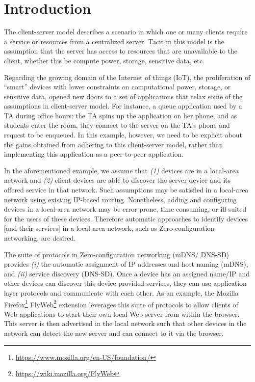 \section{Introduction}
\label{sec:introduction}


The client-server model describes a scenario in which one or many clients require a service or resources from a centralized server. Tacit in this model is the assumption that the server has access to resources that are unavailable to the client, whether this be compute power, storage, sensitive data, etc. 


Regarding the growing domain of the Internet of things (IoT), the proliferation of ``smart'' devices with lower constraints on computational power, storage, or sensitive data, opened new doors to a set of applications that relax some of the assumptions in client-server model. For instance, a queue application used by a TA during office hours: the TA spins up the application on her phone, and as students enter the room, they connect to the server on the TA's phone and request to be enqueued. In this example, however, we need to be explicit about the gains obtained from adhering to this client-server model, rather than implementing this application as a peer-to-peer application.


In the aforementioned example, we assume that {\it (1)} devices are in a local-area network and {\it (2)} client-devices are able to discover the server-device and its offered service in that network. Such assumptions may be satisfied in a local-area network using existing IP-based routing. Nonetheless, adding and configuring devices in a local-area network may be error prone, time consuming, or ill suited for the users of these devices. Therefore automatic approaches to identify devices [and their services] in a local-area network, such as Zero-configuration networking, are desired. 


The suite of protocols in Zero-configuration networking (mDNS/ DNS-SD)~\cite{rfc6762,rfc6763} provides {\it (i)} the automatic assignment of IP addresses and host naming (mDNS), and {\it (ii)} service discovery (DNS-SD). Once a device has an assigned name/IP and other devices can discover this device provided services, they can use application layer protocols and communicate with each other. As an example, the Mozilla Firefox\footnote{\url{https://www.mozilla.org/en-US/foundation/}} FlyWeb\footnote{\url{https://wiki.mozilla.org/FlyWeb}} extension leverages this suite of protocols to allow clients of Web applications to start their own local Web server from within the browser. This server is then advertised in the local network such that other devices in the network can detect the new server and can connect to it via the browser. 


